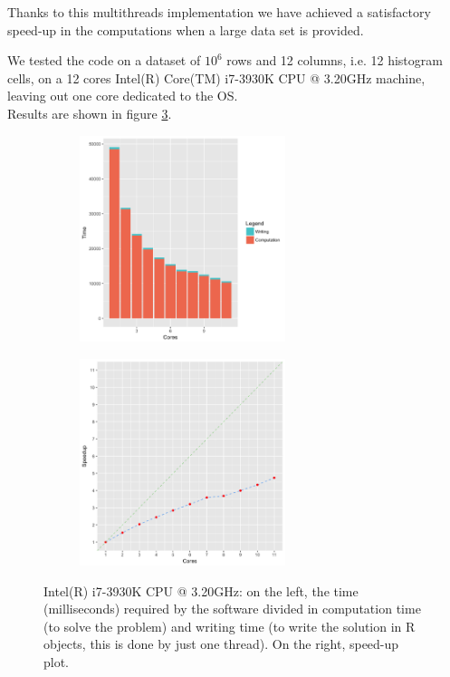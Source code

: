 Thanks to this multithreads implementation we have achieved a satisfactory speed-up in the computations when a large data set is provided.

We tested the code on a dataset of $10^{6}$ rows and 12 columns, i.e. 12 histogram cells, on a 12 cores Intel(R) Core(TM) i7-3930K CPU @ 3.20GHz machine, leaving out one core dedicated to the OS. \\ Results are shown in figure \ref{fig:giuspo12}.

\begin{figure}[ht]
	
	\begin{subfigure}{.5\textwidth}
		\includegraphics[width=6cm]{./pictures/openmp/giuspo12_time.png} 
		\label{fig:subim1}
	\end{subfigure}
	\begin{subfigure}{.5\textwidth}
		\includegraphics[width=6cm]{./pictures/openmp/giuspo12_speedup.png}
		\label{fig:subim2}
	\end{subfigure}
	
	\caption{Intel(R) i7-3930K CPU @ 3.20GHz: on the left, the time (milliseconds) required by the software divided in computation time (to solve the problem) and writing time (to write the solution in R objects, this is done by just one thread). On the right, speed-up plot.}
	\label{fig:giuspo12}
	
\end{figure}

